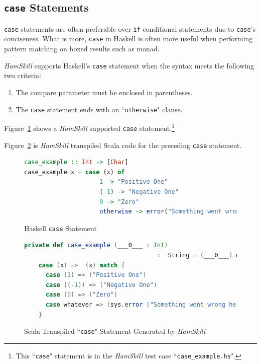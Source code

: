 \documentclass{report}
\begin{document}
\subsection{\texttt{case} Statements}

\texttt{case} statements are often preferable over \texttt{if} conditional statements due to \texttt{case}'s conciseness.  What is more, \texttt{case} in Haskell is often more useful when performing pattern matching on boxed results such as monad.

\textit{HamSkill} supports Haskell's \texttt{case} statement when the syntax meets the following two criteria:

\begin{enumerate}

\item The compare parameter must be enclosed in parentheses.

\item The \texttt{case} statement ends with an ``\texttt{otherwise}" clause.

\end{enumerate}

Figure~\ref{fig:haskellCaseStatement} shows a \textit{HamSkill} supported \texttt{case} statement.\footnote{This ``\texttt{case}" statement is in the \textit{HamSkill} test case ``\texttt{case\_example.hs}".}


Figure~\ref{fig:scalaCaseStatement} is \textit{HamSkill} transpiled Scala code for the preceding \texttt{case} statement.

\begin{figure}[H]
\begin{mdframed}
\begin{lstlisting}[language=Haskell, basicstyle=\scriptsize, showstringspaces=false]
case_example :: Int -> [Char]
case_example x = case (x) of
                     1 -> "Positive One"
                     (-1) -> "Negative One"
                     0 -> "Zero"
                     otherwise -> error("Something went wrong here")
\end{lstlisting}
\end{mdframed}
\caption{Haskell \texttt{case} Statement}\label{fig:haskellCaseStatement}
\end{figure}

\begin{figure}[H]
\begin{mdframed}
\begin{lstlisting}[language=Scala, basicstyle=\scriptsize]
private def case_example (___0___ : Int) 
                                     :  String = (___0___) match {
    case (x) =>  (x) match {
      case (1) => ("Positive One")
      case ((-1)) => ("Negative One")
      case (0) => ("Zero")
      case whatever => (sys.error ("Something went wrong here"))
    }
\end{lstlisting}
\end{mdframed}
\caption{Scala Transpiled ``\texttt{case}" Statement Generated by \textit{HamSkill}}\label{fig:scalaCaseStatement}
\end{figure}
\end{document}
